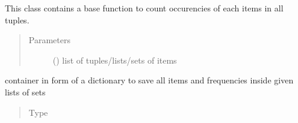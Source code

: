 \documentclass[a4paper,12pt,english]{sphinxmanual}
\begin{document}
\begin{fulllineitems}
\label{\detokenize{project_rst/generator:project.generator.BaseGenerator}}
This class contains a base function {\hyperref[\detokenize{project_rst/generator:project.generator.BaseGenerator.get_frequency}]{}} to count
occurencies of each items in all tuples.
\begin{quote}\begin{description}
\item[{Parameters}] \leavevmode
{} (\sphinxstyleliteralemphasis{\sphinxupquote{(}}\sphinxstyleliteralemphasis{\sphinxupquote{)}}) \textendash{} list of tuples/lists/sets of items

\end{description}\end{quote}

\begin{fulllineitems}
\label{\detokenize{project_rst/generator:project.generator.BaseGenerator.frequencies}}
container in form of a dictionary to
save all items and frequencies inside given lists of sets
\begin{quote}\begin{description}
\item[{Type}] \leavevmode
{}

\end{description}\end{quote}


\end{fulllineitems}
\end{fulllineitems}
\end{document}
